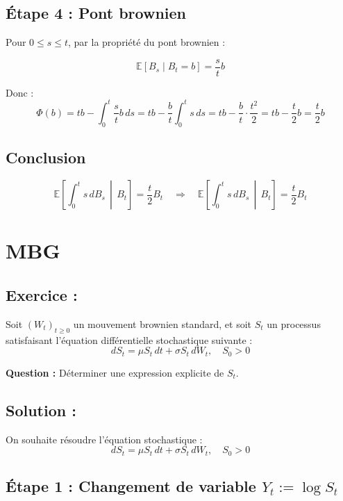 \subsection*{Étape 4 : Pont brownien}

Pour \( 0 \leq s \leq t \), par la propriété du pont brownien :

\[
\mathbb{E}[B_s \mid B_t = b] = \frac{s}{t} b
\]

Donc :
\[
\Phi(b) = t b - \int_0^t \frac{s}{t} b\, ds = t b - \frac{b}{t} \int_0^t s\, ds
= t b - \frac{b}{t} \cdot \frac{t^2}{2} = t b - \frac{t}{2} b = \frac{t}{2} b
\]


\subsection*{Conclusion}

\[
\mathbb{E} \left[ \int_0^t s\, dB_s \,\middle|\, B_t \right] = \frac{t}{2} B_t
\quad \Rightarrow \quad
\boxed{
\mathbb{E} \left[ \int_0^t s\, dB_s \,\middle|\, B_t \right] = \frac{t}{2} B_t
}
\]


\section{MBG}

\subsection*{Exercice :}

\begin{exerciseBox}[MBG]
Soit \( (W_t)_{t \geq 0} \) un mouvement brownien standard, et soit \( S_t \) un processus satisfaisant l'équation différentielle stochastique suivante :
\[
dS_t = \mu S_t\, dt + \sigma S_t\, dW_t, \quad S_0 > 0
\]

\textbf{Question :} Déterminer une expression explicite de \( S_t \).
\end{exerciseBox}


\subsection*{Solution :}

On souhaite résoudre l'équation stochastique :
\[
dS_t = \mu S_t\, dt + \sigma S_t\, dW_t, \quad S_0 > 0
\]


\subsection*{Étape 1 : Changement de variable \( Y_t := \log S_t \)}

